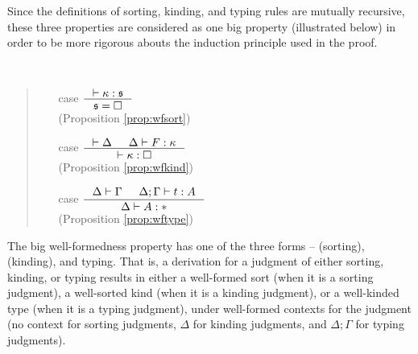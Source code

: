 Since the definitions of sorting, kinding, and typing rules are
mutually recursive, these three properties are considered as
one big property (illustrated below) in order to be more rigorous abouts
the induction principle used in the proof.
\begin{proposition*}~
\begin{quote}
\begin{itemize}
\item[case] \fbox{$ |- \kappa : \square $}\qquad\quad
 $ \inference{ |- \kappa : \mathfrak{s} }{ \mathfrak{s}=\square } $\\
 \qquad\qquad (Proposition \ref{prop:wfsort})
\item[case] \qquad
 $ \inference{ |- \Delta & \Delta |- F : \kappa}{ |- \kappa:\square } $\\
 \qquad\qquad (Proposition \ref{prop:wfkind})
\item[case] \quad
 $ \inference{ \Delta |- \Gamma & \Delta;\Gamma |- t : A}{ \Delta |- A : * } $\\
 (Proposition \ref{prop:wftype})
\end{itemize}
\end{quote}
\end{proposition*}\noindent
The big well-formedness property has one of the three forms --
\fbox{$ |- \kappa : \square $} (sorting),
 (kinding), and
 typing.
That is, a derivation for a judgment of either sorting, kinding, or typing
results in either a well-formed sort (when it is a sorting judgment),
a well-sorted kind (when it is a kinding judgment), or
a well-kinded type (when it is a typing judgment),
under well-formed contexts for the judgment (no context for sorting judgments,
$\Delta$ for kinding judgments, and $\Delta;\Gamma$ for typing judgments).

